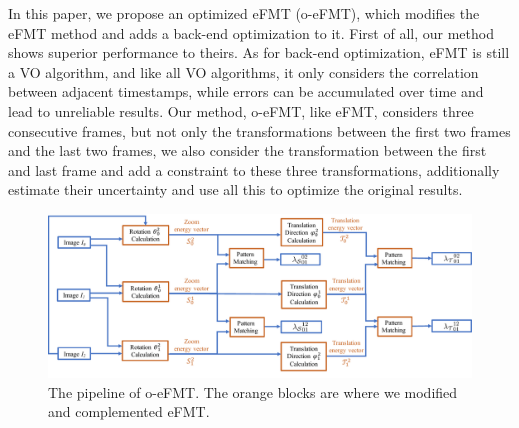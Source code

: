 \documentclass[letterpaper, 10 pt, conference]{ieeeconf}  %
\begin{document}
In this paper, we propose an optimized eFMT (o-eFMT), which modifies the eFMT method and adds a back-end optimization to it. First of all, our method shows superior performance to theirs. As for back-end optimization, eFMT is still a VO algorithm, and like all VO algorithms, it only considers the correlation between adjacent timestamps, while errors can be accumulated over time and lead to unreliable results. Our method, o-eFMT, like eFMT, considers three consecutive frames, but not only the transformations between the first two frames and the last two frames, we also consider the transformation between the first and last frame and add a constraint to these three transformations, additionally estimate their uncertainty and use all this to optimize the original results. 


\begin{figure}[t]
    \centering
    \includegraphics[width=0.95\linewidth]{./images/pipeline.pdf}
    \caption{The pipeline of o-eFMT. The orange blocks are where we modified and 
 complemented eFMT.}
    \label{fig:pipeline}
\end{figure}
\end{document}
